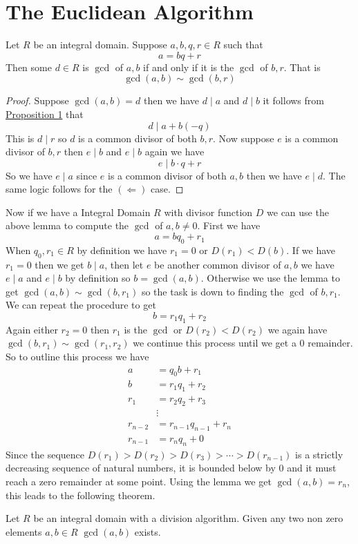 \documentclass[16pt,a4paper]{article}
\theoremstyle{definition}
\begin{document}
\section{The Euclidean Algorithm}
\begin{lemm}{}{}
Let $R$ be an integral domain. Suppose $a,b,q,r\in R$ such that 
\[a=bq+r\] 
Then some $d\in R$ is $\gcd$ of $a,b$ if and only if it is the $\gcd$ of $b,r$. That is 
\[\gcd(a,b)\sim \gcd(b,r)\]
\end{lemm}
\begin{proof}
Suppose $\gcd(a,b) = d$ then we have $d\mid a$ and $d\mid b$ it follows from \hyperref[prop1]{Proposition 1} that 
\[d\mid a+b(-q)\] 
This is $d\mid r$ so $d$ is a common divisor of both $b,r$. Now suppose $e$ is a common divisor of $b,r$ then $e\mid b$ and $e\mid b$ again we have 
\[e\mid b\cdot q + r\]
So we have $e\mid a$ since $e$ is a common divisor of both $a,b$ then we have $e\mid d$. The same logic follows for the $(\Leftarrow)$ case. 
\end{proof}
Now if we have a Integral Domain $R$ with divisor function $D$ we can use the above lemma to compute the $\gcd$ of $a,b\neq 0$. First we have 
\[a=bq_0 + r_1\]
When $q_0,r_1\in R$ by definition we have $r_1= 0$ or $D(r_1) < D(b)$. If we have $r_1 = 0$ then we get $b\mid a$, then let $e$ be another common divisor of $a,b$ we have $e\mid a$ and $e\mid b$ by definition so $b=\gcd(a,b)$. Otherwise we use the lemma to get $\gcd(a,b)\sim \gcd(b,r_1)$ so the task is down to finding the $\gcd$ of $b,r_1$. \newpage
We can repeat the procedure to get
\[b=r_1q_1 + r_2\] 
Again either $r_2 = 0$ then $r_1$ is the $\gcd$ or $D(r_2)<D(r_2)$ we again have $\gcd(b,r_1)\sim \gcd(r_1,r_2)$ we continue this process until we get a $0$ remainder. So to outline this process we have 
\begin{align*}
a&=q_0b+r_1 \\
b &= r_1q_1 + r_2 \\
r_1 &= r_2q_2+r_3 \\
&\vdots \\
r_{n-2} &= r_{n-1}q_{n-1} + r_{n} \\
r_{n-1} &= r_{n}q_{n} + 0
\end{align*}
Since the sequence $D(r_1)>D(r_2)>D(r_3)>\cdots>D(r_{n-1})$ is a strictly decreasing sequence of natural numbers, it is bounded below by 0 and it must reach a zero remainder at some point. Using the lemma we get $\gcd(a,b) = r_{n}$, this leads to the following theorem. 

\begin{thm}{}{}\label{thm9}
Let $R$ be an integral domain with a division algorithm. Given any two non zero elements $a,b\in R$ $\gcd(a,b)$ exists.  
\end{thm}
\end{document}
